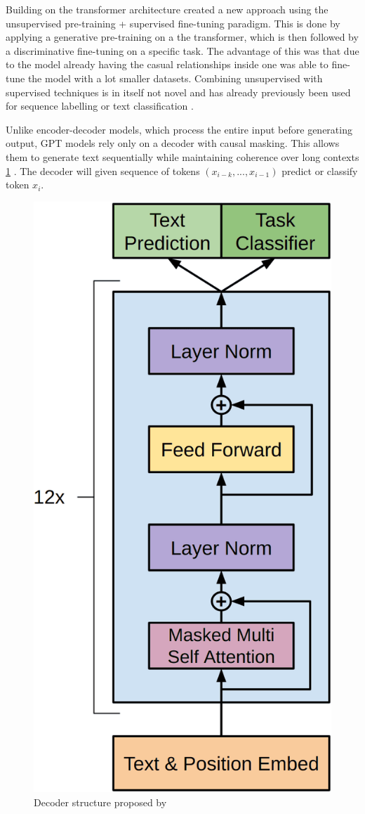 Building on the transformer architecture \citep{radford2018improving} created a new approach using the unsupervised pre-training + supervised fine-tuning paradigm. This is done by applying a generative pre-training on a the transformer, which is then followed by a discriminative fine-tuning on a specific task. The advantage of this was that due to the model already having the casual relationships inside one was able to fine-tune the model with a lot smaller datasets. Combining unsupervised with supervised techniques is in itself not novel and has already previously been used for sequence labelling or text classification \cite{van2020survey, yarowsky1995unsupervised}.


Unlike encoder-decoder models, which process the entire input before generating output, GPT models rely only on a decoder with causal masking. This allows them to generate text sequentially while maintaining coherence over long contexts \ref{fig:decoder} \cite{radford2018improving,brown2020language}. The decoder will given sequence of tokens $(x_{i-k},...,x_{i-1})$ predict or classify token $x_i$. 


\begin{figure}
    \centering
    \includegraphics[width=0.5\linewidth]{imgs/decoder.png}
    \caption{Decoder structure proposed by \citet{radford2018improving}}
    \label{fig:decoder}
\end{figure}



